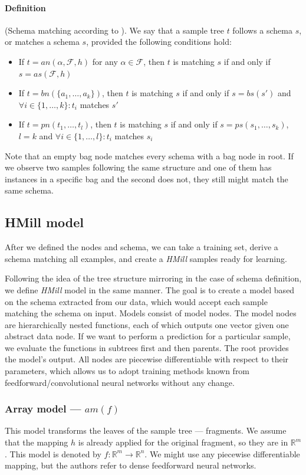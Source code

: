 \paragraph{Definition} (Schema matching according to \cite{Mandlik2020}). We say that a sample tree $t$ follows a schema $s$, or matches a schema $s$, provided the following conditions hold:
\begin{itemize}
    \itemsep0em 
    \item If $t=an(\alpha,\mathcal{F},h)$ for any $\alpha\in\mathcal{F}$, then $t$ is matching $s$ if and only if $s=as(\mathcal{F},h)$
    \item If $t=bn(\{a_1,\dots,a_k\})$, then $t$ is matching $s$ if and only if $s=bs(s')$ and $\forall i\in\{1,\dots,k\}:t_i$ matches $s'$
    \item If $t=pn(t_1,\dots,t_l)$, then $t$ is matching $s$ if and only if $s=ps(s_1,\dots,s_k)$,$l=k$ and $\forall i\in\{1,\dots,l\}:t_i$ matches $s_i$
\end{itemize}

Note that an empty bag node matches every schema with a bag node in root. If we observe two samples following the same structure and one of them has instances in a specific bag and the second does not, they still might match the same schema.

\subsection{HMill model}
After we defined the nodes and schema, we can take a training set, derive a schema matching all examples, and create a \emph{HMill} samples ready for learning. 

Following the idea of the tree structure mirroring in the case of schema definition, we define \emph{HMill} model in the same manner. The goal is to create a model based on the schema extracted from our data, which would accept each sample matching the schema on input. Models consist of model nodes. The model nodes are hierarchically nested functions, each of which outputs one vector given one abstract data node. If we want to perform a prediction for a particular sample, we evaluate the functions in subtrees first and then parents. The root provides the model's output. All nodes are piecewise differentiable with respect to their parameters, which allows us to adopt training methods known from feedforward/convolutional neural networks without any change.

\subsubsection{Array model --- $am(f)$}
This model transforms the leaves of the sample tree --- fragments. We assume that the mapping $h$ is already applied for the original fragment, so they are in $\mathbb{R}^m$.  This model is denoted by $f:\mathbb{R}^m\rightarrow\mathbb{R}^n$. We might use any piecewise differentiable mapping, but the authors refer to dense feedforward neural networks.

